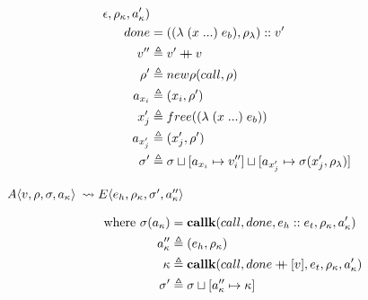 \documentclass[12pt,draft]{article}
\newcommand\mdoubleplus{\ensuremath{\mathbin{+\mkern-9mu+}}}
\newcommand{\E}[4]{E\langle #1 , #2 , #3 , #4 \rangle}
\newcommand{\A}[4]{A\langle #1 , #2 , #3 , #4 \rangle}
\begin{document}
\begin{multicols*}{2}
\begin{align*}
                       \epsilon , \cenv_{\ckont} , \ckaddr') \\
    done &= ((\lambda \; (x \; ...) \; e_b) , \cenv_{\lambda}) :: v' \\
    v'' &\triangleq v' \mdoubleplus v \\
    \cenv' &\triangleq \cnewenv(call , \cenv) \\
    a_{x_{i}} &\triangleq (x_i , \cenv') \\
    x_{j}' &\triangleq free((\lambda \; (x \; ...) \; e_b)) \\
    a_{x_{j}'} &\triangleq (x'_j , \cenv') \\
    \cstore' &\triangleq \cstore \sqcup [a_{x_i} \mapsto v_i'']
               \sqcup [a_{x_{j}'} \mapsto \cstore(x_{j}' , \cenv_{\lambda})] \\
  \end{align*}
  \begin{center}
    $\A{v}{\cenv}{\cstore}{\ckaddr}$
    $\leadsto \E{e_h}{\cenv_{\kappa}}{\cstore'}{\ckaddr''}$
  \end{center}
  \vspace{-7mm}
  \begin{align*}
    \text{where }
    \cstore(\ckaddr) &= \textbf{callk}(call, done , e_h::e_t ,
                       \cenv_{\ckont} , \ckaddr') \\
    \ckaddr'' &\triangleq (e_h , \cenv_{\ckont})\\
    \ckont &\triangleq \textbf{callk}(call, done \mdoubleplus [v] ,
                 e_t , \cenv_{\ckont} , \ckaddr') \\
    \cstore' &\triangleq \cstore \sqcup [\ckaddr'' \mapsto \ckont]
  \end{align*}
  \begin{center}
  \end{center}
  \vspace{-7mm}
  \begin{align*}
  \end{align*}
  \begin{center}
  \end{center}
  \vspace{-7mm}
  \begin{align*}
  \end{align*}
\end{multicols*}
\end{document}
